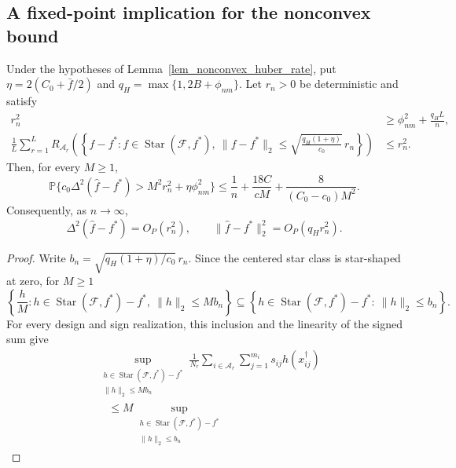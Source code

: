 \documentclass[twoside,11pt]{article}
\newenvironment{revision}{\color{revisionred}}{}
\begin{document}
\subsection{A fixed-point implication for the nonconvex bound}
\begin{revision}
\begin{corollary}
\label{cor_nonconvex_critical_radius}
Under the hypotheses of Lemma~\ref{lem_nonconvex_huber_rate}, put
$\eta=2(C_0+\bar f/2)$ and $q_H=\max\{1,2B+\phi_{nm}\}$.
Let $r_n>0$ be deterministic and satisfy
\begin{equation}
\label{eq_nonconvex_fixed_point}
\begin{aligned}
r_n^2&\geq\phi_{nm}^2+\frac{q_H L}{n},\\
\frac1L\sum_{r=1}^L R_{\mathcal A_r}
\left(\left\{f-f^*:f\in\operatorname{Star}(\mathcal F,f^*),\
\|f-f^*\|_2\leq
\sqrt{\frac{q_H(1+\eta)}{c_0}}\,r_n\right\}\right)
&\leq r_n^2 .
\end{aligned}
\end{equation}
Then, for every $M\geq1$,
\begin{equation}
\label{eq_nonconvex_fixed_point_tail}
\mathbb P\{c_0\Delta^2(\hat f-f^*)>
                  M^2r_n^2+\eta\phi_{nm}^2\}
\leq\frac1n+\frac{18C}{cM}+
               \frac{8}{(C_0-c_0)M^2}.
\end{equation}
Consequently, as $n\to\infty$,
\begin{equation}
\label{eq_nonconvex_Op_rate}
\Delta^2(\hat f-f^*)=O_P(r_n^2),
\qquad
\|\hat f-f^*\|_2^2=O_P(q_Hr_n^2).
\end{equation}
\end{corollary}
\begin{proof}
Write $b_n=\sqrt{q_H(1+\eta)/c_0}\,r_n$.
Since the centered star class is star-shaped at zero, for $M\geq1$
\[
\left\{\frac{h}{M}:
h\in\operatorname{Star}(\mathcal F,f^*)-f^*,\
\|h\|_2\leq M b_n\right\}
\subseteq
\left\{h\in\operatorname{Star}(\mathcal F,f^*)-f^*:\
\|h\|_2\leq b_n\right\}.
\]
For every design and sign realization, this inclusion and the
linearity of the signed sum give
\begin{align*}
&\sup_{\substack{h\in\operatorname{Star}(\mathcal F,f^*)-f^*\\
                \|h\|_2\leq M b_n}}
\frac1{N_r}\sum_{i\in\mathcal A_r}\sum_{j=1}^{m_i}s_{ij}h(x_{ij}^\dagger)\\
&\quad\leq M
\sup_{\substack{h\in\operatorname{Star}(\mathcal F,f^*)-f^*\\
                \|h\|_2\leq b_n}}

\end{align*}
\end{proof}
\end{revision}
\end{document}
